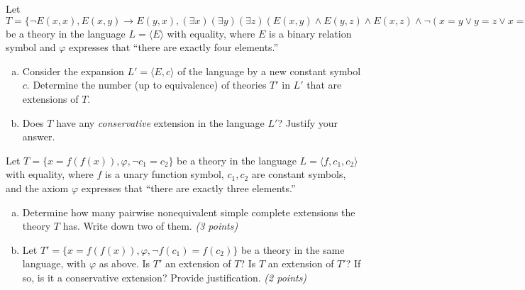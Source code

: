 \begin{problem}

    Let $T=\{\neg E(x,x), E(x,y)\to E(y,x), (\exists x)(\exists y)(\exists z)(E(x,y)\wedge E(y,z)\wedge E(x,z)\wedge \neg(x=y\vee y=z\vee x=z)),\varphi\}$ be a theory in the language $L=\langle E\rangle$ with equality, where $E$ is a binary relation symbol and $\varphi$ expresses that “there are exactly four elements.”
    \begin{enumerate}[(a)]
        \item Consider the expansion $L'=\langle E,c\rangle$ of the language by a new constant symbol $c$. Determine the number (up to equivalence) of theories $T'$ in $L'$ that are extensions of $T$. 
        \item Does $T$ have any \emph{conservative} extension in the language $L'$? Justify your answer.
    \end{enumerate}

\end{problem}


\begin{problem}

    Let $T=\{x=f(f(x)),\varphi, \neg c_1 = c_2\}$ be a theory in the language $L=\langle f,c_1,c_2\rangle$ with equality, where $f$ is a unary function symbol, $c_1,c_2$ are constant symbols, and the axiom $\varphi$ expresses that “there are exactly three elements.”
    \begin{enumerate}[(a)]    
        \item Determine how many pairwise nonequivalent simple complete extensions the theory $T$ has. Write down two of them. {\it (3 points)}
        \item Let $T'=\{x=f(f(x)),\varphi,\neg f(c_1)=f(c_2)\}$ be a theory in the same language, with $\varphi$ as above. Is $T'$ an extension of $T$? Is $T$ an extension of $T'$? If so, is it a conservative extension? Provide justification. {\it (2 points)}
    \end{enumerate}
    
\end{problem}


